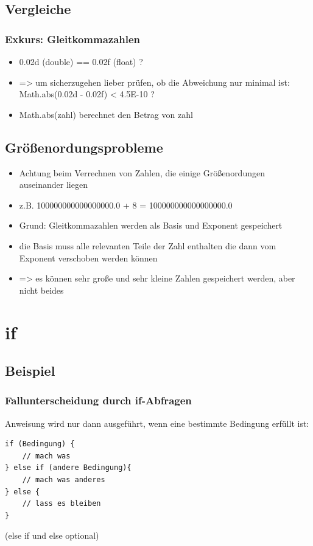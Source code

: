 \documentclass[final]{beamer}
\begin{document}
\subsection{Vergleiche}
\begin{frame}
	\frametitle{Exkurs: Gleitkommazahlen}
	\begin{itemize}
		\item{0.02d (double) == 0.02f (float) ?}
		\item{=> um sicherzugehen lieber prüfen, ob die Abweichung nur minimal ist: \\
		Math.abs(0.02d - 0.02f) < 4.5E-10 ?}
		\item{Math.abs(zahl) berechnet den Betrag von zahl}
	\end{itemize}
\end{frame}

\subsection{Größenordungsprobleme}
\begin{frame}
	\begin{itemize}
		\item{Achtung beim Verrechnen von Zahlen, die einige Größenordungen auseinander liegen}
		\item{z.B. 100000000000000000.0 + 8 = 100000000000000000.0}
		\item{Grund: Gleitkommazahlen werden als Basis und Exponent gespeichert}
		\item{die Basis muss alle relevanten Teile der Zahl enthalten die dann vom Exponent verschoben werden können}
		\item{=> es können sehr große und sehr kleine Zahlen gespeichert werden, aber nicht beides}
	\end{itemize}
\end{frame}

\section{if}
\subsection{Beispiel}
\begin{frame}[containsverbatim]
	\frametitle{Fallunterscheidung durch if-Abfragen}
	Anweisung wird nur dann ausgeführt, wenn eine bestimmte Bedingung erfüllt ist:
	\begin{lstlisting}
if (Bedingung) {
	// mach was
} else if (andere Bedingung){
	// mach was anderes
} else {
	// lass es bleiben
}
	\end{lstlisting}
	(else if und else optional)
\end{frame}
\end{document}
